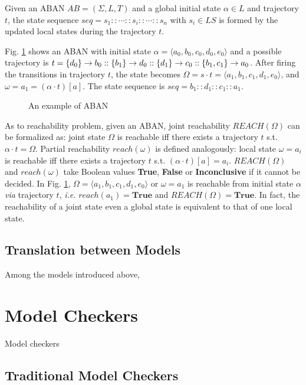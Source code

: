 \begin{definition}
Given an ABAN $AB = (\Sigma,L,T)$ and a global initial state $\alpha\in L$ and trajectory $t$, the state sequence $seq=s_1::\cdots :: s_i::\cdots ::s_n$ with $s_i\in LS$ is formed by the updated local states during the trajectory $t$.
\end{definition}


\begin{example}
    Fig. \ref{exampleABAN} shows an ABAN with initial state $\alpha=\langle a_0,b_0,c_0,d_0,e_0\rangle$ and a possible trajectory is $t=\acm{d_0}{b_0}{b_1}::\acm{b_1}{d_0}{d_1}::\acm{d_1}{c_0}{c_1}::\acm{b_1,c_1}{a_0}{a_1}$.
    After firing the transitions in trajectory $t$, the state becomes $\Omega=s\cdot t=\langle a_1,b_1,c_1,d_1,e_0\rangle$, and $\omega= a_1= (\alpha\cdot t)[a]$. The state sequence is $seq=b_1::d_1::c_1::a_1$.
\end{example}

\begin{figure}[ht]
\centering

\caption{An example of ABAN}\label{exampleABAN}
\end{figure}
As to reachability problem, given an ABAN, joint reachability $REACH (\Omega)$ can be formalized as: joint state $\Omega$ is reachable iff there exists a trajectory $t$ s.t. $\alpha\cdot t=\Omega$.
Partial reachability $reach(\omega)$ is defined analogously: local state $\omega=a_i$ is reachable iff there exists a trajectory $t$ s.t. $(\alpha\cdot t)[a]=a_i$.
$REACH (\Omega)$ and $reach(\omega)$ take Boolean values \textbf{True}, \textbf{False} or \textbf{Inconclusive} if it cannot be decided.
In Fig. \ref{exampleABAN}, $\Omega=\langle a_1,b_1,c_1,d_1,e_0\rangle$ or $\omega=a_1$ is reachable from initial state $\alpha$ \textit{via} trajectory $t$, \textit{i.e.} $reach(a_1)=\textbf{True}$ and $REACH(\Omega)=\textbf{True}$. 
In fact, the reachability of a joint state even a global state is equivalent to that of one local state. 

\subsection{Translation between Models}
Among the models introduced above, 
\section{Model Checkers}
Model checkers 
\subsection{Traditional Model Checkers}

